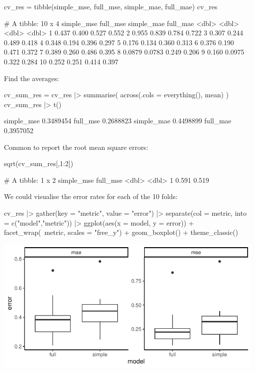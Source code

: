 \documentclass[a4paper]{article}\usepackage[]{graphicx}\usepackage[]{xcolor}
\makeatletter
\def\maxwidth{ %
  \ifdim\Gin@nat@width>\linewidth
    \linewidth
  \else
    \Gin@nat@width
  \fi
}
\makeatother
\begin{document}
\begin{Schunk}
\begin{Sinput}
cv_res = tibble(simple_mse, full_mse, 
                simple_mae, full_mae)
cv_res
\end{Sinput}
\begin{Soutput}
# A tibble: 10 x 4
   simple_mse full_mse simple_mae full_mae
        <dbl>    <dbl>      <dbl>    <dbl>
 1     0.437    0.400       0.527    0.552
 2     0.955    0.839       0.784    0.722
 3     0.307    0.244       0.489    0.418
 4     0.348    0.194       0.396    0.297
 5     0.176    0.134       0.360    0.313
 6     0.376    0.190       0.471    0.372
 7     0.389    0.260       0.486    0.395
 8     0.0879   0.0783      0.249    0.206
 9     0.160    0.0975      0.322    0.284
10     0.252    0.251       0.414    0.397
\end{Soutput}
\end{Schunk}
Find the averages:
\begin{Schunk}
\begin{Sinput}
cv_sum_res = cv_res |> 
  summarise(
    across(.cols = everything(), 
           mean)
  )
cv_sum_res |> t()
\end{Sinput}
\begin{Soutput}
                [,1]
simple_mse 0.3489454
full_mse   0.2688823
simple_mae 0.4498899
full_mae   0.3957052
\end{Soutput}
\end{Schunk}
Common to report the root mean square errors:
\begin{Schunk}
\begin{Sinput}
sqrt(cv_sum_res[,1:2])
\end{Sinput}
\begin{Soutput}
# A tibble: 1 x 2
  simple_mse full_mse
       <dbl>    <dbl>
1      0.591    0.519
\end{Soutput}
\end{Schunk}
We could visualise the error rates for each of the 10 folds:
\begin{Schunk}
\begin{Sinput}
cv_res |> gather(key = "metric", value = "error") |> 
  separate(col = metric, into = c("model","metric")) |> 
  ggplot(aes(x = model, y = error)) + facet_wrap(~metric, scales = "free_y") + 
  geom_boxplot() +
  theme_classic()
\end{Sinput}


{\centering \includegraphics[width=\maxwidth]{figure/listings-unnamed-chunk-406-1} 

}

\end{Schunk}
\end{document}
